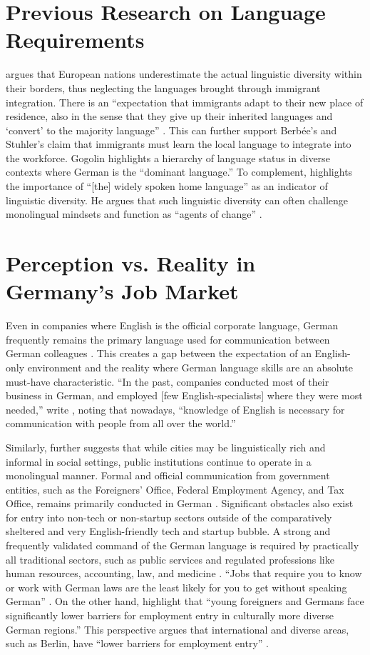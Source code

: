 \section{Previous Research on Language Requirements}
\citet{gogolin02} argues that European nations underestimate the actual linguistic diversity within their borders, thus neglecting the languages brought through immigrant integration. There is an “expectation that immigrants adapt to their new place of residence, also in the sense that they give up their inherited languages and ‘convert’ to the majority language” \citep{gogolin02}. This can further support Berbée’s and Stuhler’s claim that immigrants must learn the local language to integrate into the workforce. Gogolin highlights a hierarchy of language status in diverse contexts where German is the “dominant language.” To complement, \citet{Extra10diversity} highlights the importance of “[the] widely spoken home language” as an indicator of linguistic diversity. He argues that such linguistic diversity can often challenge monolingual mindsets and function as “agents of change” \citep{Extra10diversity}.

\section{Perception vs. Reality in Germany's Job Market}
Even in companies where English is the official corporate language, German frequently remains the primary language used for communication between German colleagues \citep{ErlingWalton07}. This creates a gap between the expectation of an English-only environment and the reality where German language skills are an absolute must-have characteristic. “In the past, companies conducted most of their business in German, and employed [few English-specialists] where they were most needed,” write \citet{ErlingWalton07}, noting that nowadays, “knowledge of English is necessary for communication with people from all over the world.”

Similarly, \citet{Extra10diversity} further suggests that while cities may be linguistically rich and informal in social settings, public institutions continue to operate in a monolingual manner. Formal and official communication from government entities, such as the Foreigners’ Office, Federal Employment Agency, and Tax Office, remains primarily conducted in German \citep{kummuni25Language}. Significant obstacles also exist for entry into non-tech or non-startup sectors outside of the comparatively sheltered and very English-friendly tech and startup bubble. A strong and frequently validated command of the German language is required by practically all traditional sectors, such as public services and regulated professions like human resources, accounting, law, and medicine \citep{simplegermany25}. “Jobs that require you to know or work with German laws are the least likely for you to get without speaking German” \citep{simplegermany25}. On the other hand, \citet{DamelangHaas12} highlight that “young foreigners and Germans face significantly lower barriers for employment entry in culturally more diverse German regions.” This perspective argues that international and diverse areas, such as Berlin, have “lower barriers for employment entry” \citep{DamelangHaas12}.


